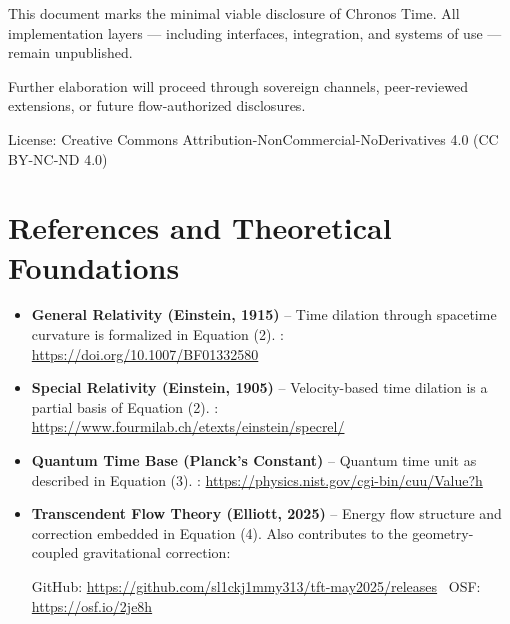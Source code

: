 \documentclass[11pt]{article}
\begin{document}
This document marks the minimal viable disclosure of Chronos Time.  
All implementation layers — including interfaces, integration, and systems of use — remain unpublished.

Further elaboration will proceed through sovereign channels, peer-reviewed extensions, or future flow-authorized disclosures.

\vspace{2em}
{\footnotesize \noindent License: Creative Commons Attribution-NonCommercial-NoDerivatives 4.0 (CC BY-NC-ND 4.0)}


\section*{References and Theoretical Foundations}
\begin{itemize} \item \textbf{General Relativity (Einstein, 1915)} – Time dilation through spacetime curvature is formalized in Equation (2). \Source: \url{https://doi.org/10.1007/BF01332580}
\item \textbf{Special Relativity (Einstein, 1905)} – Velocity-based time dilation is a partial basis of Equation (2). \Source: \url{https://www.fourmilab.ch/etexts/einstein/specrel/}
\item \textbf{Quantum Time Base (Planck’s Constant)} – Quantum time unit as described in Equation (3). \Source: \url{https://physics.nist.gov/cgi-bin/cuu/Value?h}
\item \textbf{Transcendent Flow Theory (Elliott, 2025)} – Energy flow structure and correction embedded in Equation (4). Also contributes to the geometry-coupled gravitational correction:

GitHub: \url{https://github.com/sl1ckj1mmy313/tft-may2025/releases} \ OSF: \url{https://osf.io/2je8h} \end{itemize}
\end{document}
